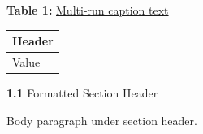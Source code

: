 \documentclass[11pt,a4paper]{article}
\begin{document}
\textbf{Table 1:} \href{https://example.org/caption}{Multi-run caption text}

\begin{table}[h]
\begin{tabular}{|l|}
\hline
Header \\ \hline
Value \\ \hline
\end{tabular}
\end{table}

\textbf{1.1} Formatted Section Header

Body paragraph under section header.
\end{document}
